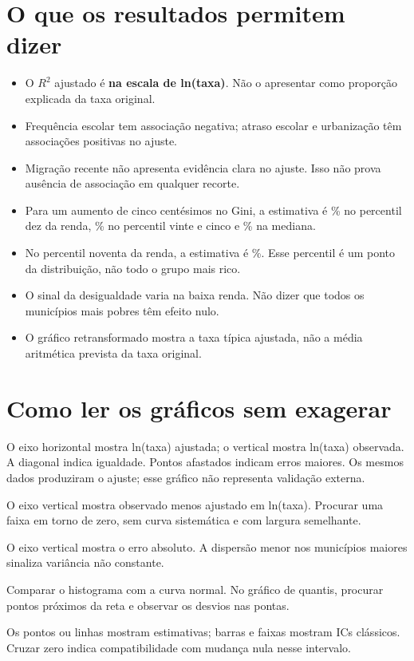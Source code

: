 \section{O que os resultados permitem dizer}
\begin{itemize}
\item O $R^2$ ajustado é \nRdoisA{} \textbf{na escala de ln(taxa)}. Não o apresentar como proporção explicada da taxa original.
\item Frequência escolar tem associação negativa; atraso escolar e urbanização têm associações positivas no ajuste.
\item Migração recente não apresenta evidência clara no ajuste. Isso não prova ausência de associação em qualquer recorte.
\item Para um aumento de cinco centésimos no Gini, a estimativa é \nGiniEfDez\% no percentil dez da renda, \nGiniEfVinteCinco\% no percentil vinte e cinco e \nGiniEfMediana\% na mediana.
\item No percentil noventa da renda, a estimativa é \nGiniEfNoventa\%. Esse percentil é um ponto da distribuição, não todo o grupo mais rico.
\item O sinal da desigualdade varia na baixa renda. Não dizer que todos os municípios mais pobres têm efeito nulo.
\item O gráfico retransformado mostra a taxa típica ajustada, não a média aritmética prevista da taxa original.
\end{itemize}

\section{Como ler os gráficos sem exagerar}
\begin{description}[leftmargin=0pt]
\item[Observado contra ajustado.] O eixo horizontal mostra ln(taxa) ajustada; o vertical mostra ln(taxa) observada. A diagonal indica igualdade. Pontos afastados indicam erros maiores. Os mesmos dados produziram o ajuste; esse gráfico não representa validação externa.
\item[Resíduos contra valores ajustados.] O eixo vertical mostra observado menos ajustado em ln(taxa). Procurar uma faixa em torno de zero, sem curva sistemática e com largura semelhante.
\item[Tamanho dos resíduos contra população.] O eixo vertical mostra o erro absoluto. A dispersão menor nos municípios maiores sinaliza variância não constante.
\item[Histograma e gráfico de quantis.] Comparar o histograma com a curva normal. No gráfico de quantis, procurar pontos próximos da reta e observar os desvios nas pontas.
\item[Pontos, barras e faixa de confiança.] Os pontos ou linhas mostram estimativas; barras e faixas mostram ICs clássicos. Cruzar zero indica compatibilidade com mudança nula nesse intervalo.
\end{description}


